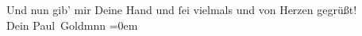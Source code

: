 \pstart
           Und nun gib’ mir Deine Hand und ſei  vielmals
               und von Herzen gegrüßt! {\\[\baselineskip]}Dein \spacefill\mbox{Paul Goldmnn}\pend
           \leftskip=0em{}\endnumbering{}
\begin{anhang}
\end{anhang}
      